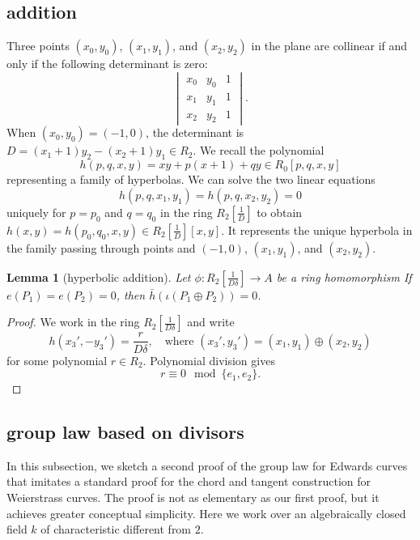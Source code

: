\documentclass[12pt]{article}
\newtheorem{lemma}[theorem]{Lemma}
\newcommand{\f}[1]{\frac{1}{#1}}
\begin{document}
\subsection{addition}

Three points $(x_0,y_0)$, $(x_1,y_1)$, and $(x_2,y_2)$ in the plane
are collinear if and only if the following determinant is zero:
\[
\begin{vmatrix}
x_0 & y_0 & 1\\
x_1 & y_1 & 1\\
x_2 & y_2 & 1
\end{vmatrix}.
\]
When $(x_0,y_0) = (-1,0)$, the determinant
is $D= (x_1+1) y_2 - (x_2+1) y_1\in R_2$. 
We recall the polynomial
\[
h(p,q,x,y) = x y + p (x+1) + q y \in R_0[p,q,x,y]
\]
representing a family of hyperbolas.
We can solve the two linear equations
\begin{equation}\label{eqn:pq}
h(p,q,x_1,y_1)=h(p,q,x_2,y_2)=0
\end{equation}
uniquely for $p=p_0$ and $q=q_0$ in the ring $R_2[\f{D}]$ to obtain
$h(x,y) = h(p_0,q_0,x,y) \in R_2[\f{D}][x,y]$.  It represents the
unique hyperbola in the family passing through points and $(-1,0)$,
$(x_1,y_1)$, and $(x_2,y_2)$.
 
\begin{lemma}[hyperbolic addition]\label{lemma:hyperbola}
  Let $\phi:R_2[\f{D\delta}]\to A$ be a ring homomorphism 
  If $e(P_1) =  e(P_2) = 0$, then
  $\bar h(\iota(P_1\oplus P_2))=0$.
\end{lemma}

\begin{proof}
  We work in the ring $R_2[\f{D\delta}]$ and write
\[
h(x_3',-y_3') = \frac{r}{D\delta},\quad 
\text{where } (x_3',y_3') = (x_1,y_1)\oplus (x_2,y_2)
\]
for some polynomial $r \in R_2$.  Polynomial division gives
\begin{equation}\label{eqn:h}
r \equiv 0 \mod \{e_1,e_2\}.
\end{equation}
\end{proof}

\subsection{group law based on divisors}

In this subsection, we sketch a second proof of the group law for
Edwards curves that imitates a standard proof for the chord and
tangent construction for Weierstrass curves.  The proof is not as
elementary as our first proof, but it achieves greater conceptual
simplicity.  Here we work over an algebraically closed field $k$ of
characteristic different from $2$.
\end{document}
